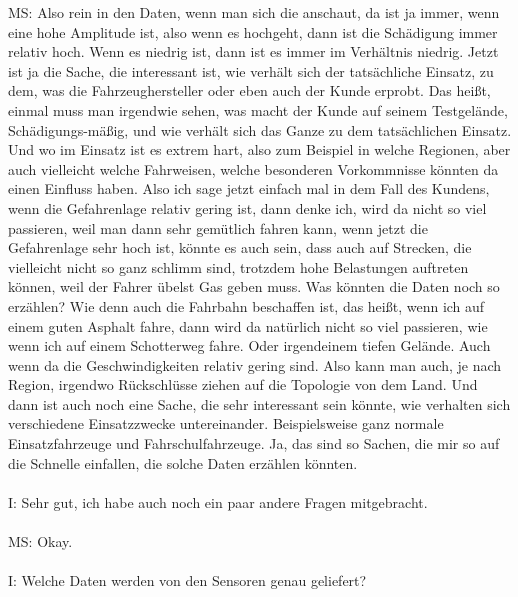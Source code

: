 \begin{linenumbers}
MS: Also rein in den Daten, wenn man sich die anschaut, da ist ja immer, wenn eine hohe Amplitude ist, also wenn es hochgeht, dann ist die Schädigung immer relativ hoch. Wenn es niedrig ist, dann ist es immer im Verhältnis niedrig. Jetzt ist ja die Sache, die interessant ist, wie verhält sich der tatsächliche Einsatz, zu dem, was die Fahrzeughersteller oder eben auch der Kunde erprobt. Das heißt, einmal muss man irgendwie sehen, was macht der Kunde auf seinem Testgelände, Schädigungs-mäßig, und wie verhält sich das Ganze zu dem tatsächlichen Einsatz. Und wo im Einsatz ist es extrem hart, also zum Beispiel in welche Regionen, aber auch vielleicht welche Fahrweisen, welche besonderen Vorkommnisse könnten da einen Einfluss haben. Also ich sage jetzt einfach mal in dem Fall des Kundens, wenn die Gefahrenlage relativ gering ist, dann denke ich, wird da nicht so viel passieren, weil man dann sehr gemütlich fahren kann, wenn jetzt die Gefahrenlage sehr hoch ist, könnte es auch sein, dass auch auf Strecken, die vielleicht nicht so ganz schlimm sind, trotzdem hohe Belastungen auftreten können, weil der Fahrer übelst Gas geben muss. Was könnten die Daten noch so erzählen? Wie denn auch die Fahrbahn beschaffen ist, das heißt, wenn ich auf einem guten Asphalt fahre, dann wird da natürlich nicht so viel passieren, wie wenn ich auf einem Schotterweg fahre. Oder irgendeinem tiefen Gelände. Auch wenn da die Geschwindigkeiten relativ gering sind. Also kann man auch, je nach Region, irgendwo Rückschlüsse ziehen auf die Topologie von dem Land. Und dann ist auch noch eine Sache, die sehr interessant sein könnte, wie verhalten sich verschiedene Einsatzzwecke untereinander. Beispielsweise ganz normale Einsatzfahrzeuge und Fahrschulfahrzeuge. Ja, das sind so Sachen, die mir so auf die Schnelle einfallen, die solche Daten erzählen könnten.\\\\
I: Sehr gut, ich habe auch noch ein paar andere Fragen mitgebracht.\\\\
MS: Okay.\\\\
I: Welche Daten werden von den Sensoren genau geliefert?\\\\

\end{linenumbers}
